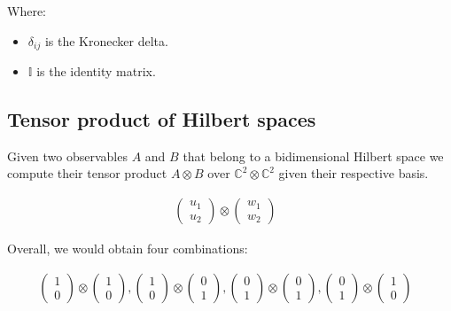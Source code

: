 \documentclass{Configuration_Files/PoliMi3i_thesis}
\begin{document}
Where:

\begin{itemize}
	\item \( \delta_{ij} \) is the Kronecker delta.
	\item \( \mathbb{I} \) is the identity matrix.
\end{itemize}


\subsection{Tensor product of Hilbert spaces}

Given two observables $A$ and $B$ that belong to a bidimensional Hilbert space we compute their tensor product $A \otimes B$ over $\mathbb{C}^2 \otimes \mathbb{C}^2$ given their respective basis.


\[
\begin{array}{ccc}
	\begin{pmatrix}
		u_1  \\
		u_2  
	\end{pmatrix} 
	\otimes
	\begin{pmatrix}
		w_1  \\
		w_2 
	\end{pmatrix} &
\end{array}
\]

Overall, we would obtain four combinations:

\[
\begin{array}{ccc}
	\begin{pmatrix}
		1 \\
		0  
	\end{pmatrix} 
	\otimes
	\begin{pmatrix}
		1  \\
		0 
	\end{pmatrix} ,
	
	\begin{pmatrix}
		1 \\
		0  
	\end{pmatrix} 
	\otimes
	\begin{pmatrix}
		0  \\
		1 
	\end{pmatrix} ,
	
	\begin{pmatrix}
		0 \\
		1  
	\end{pmatrix} 
	\otimes
	\begin{pmatrix}
		0  \\
		1 
	\end{pmatrix} ,
	
	\begin{pmatrix}
		0 \\
		1  
	\end{pmatrix} 
	\otimes
	\begin{pmatrix}
		1  \\
		0 
	\end{pmatrix} &
\end{array}
\]
\end{document}

